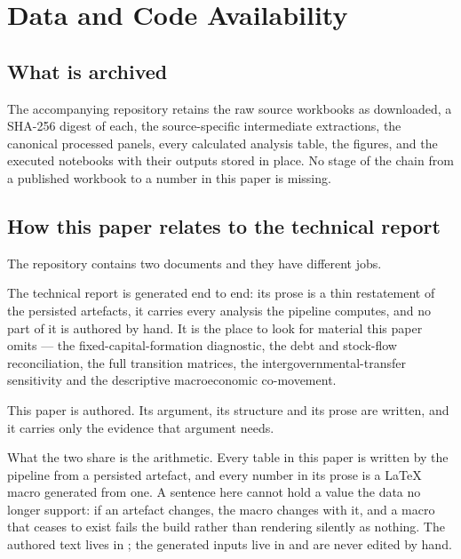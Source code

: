 
\section{Data and Code Availability}
\label{sec:reproducibility}

\subsection{What is archived}

The accompanying repository retains the raw source workbooks as downloaded, a
SHA-256 digest of each, the source-specific intermediate extractions, the canonical
processed panels, every calculated analysis table, the figures, and the executed
notebooks with their outputs stored in place. No stage of the chain from a published
workbook to a number in this paper is missing.

\subsection{How this paper relates to the technical report}

The repository contains two documents and they have different jobs.

The technical report is generated end to end: its prose is a thin restatement of the
persisted artefacts, it carries every analysis the pipeline computes, and no part of
it is authored by hand. It is the place to look for material this paper omits ---
the fixed-capital-formation diagnostic, the debt and stock-flow reconciliation, the
full transition matrices, the intergovernmental-transfer sensitivity and the
descriptive macroeconomic co-movement.

This paper is authored. Its argument, its structure and its prose are written, and
it carries only the evidence that argument needs.

What the two share is the arithmetic. Every table in this paper is written by the
pipeline from a persisted artefact, and every number in its prose is a LaTeX macro
generated from one. A sentence here cannot hold a value the data no longer support:
if an artefact changes, the macro changes with it, and a macro that ceases to exist
fails the build rather than rendering silently as nothing. The authored text lives in
; the generated inputs live in  and are
never edited by hand.

